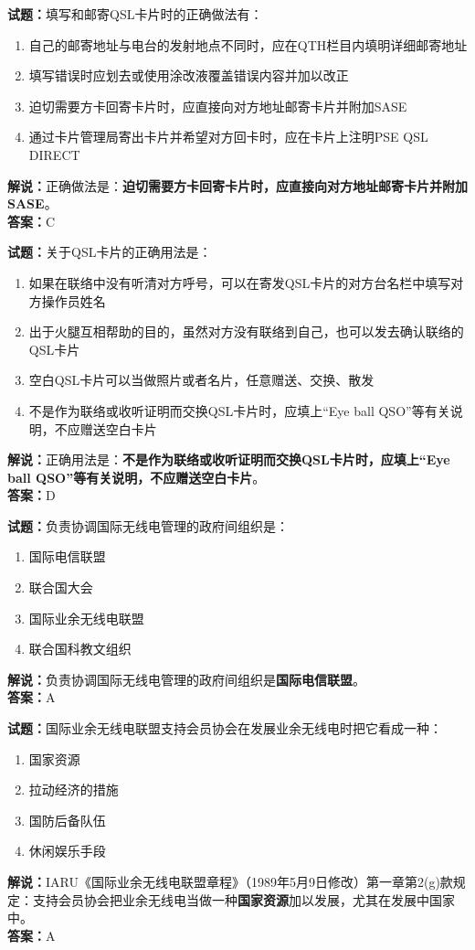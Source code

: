 \documentclass{ctexbook}
\begin{document}
\bigskip

\noindent\textbf{试题：}填写和邮寄QSL卡片时的正确做法有：
\begin{enumerate}[leftmargin=3em]
  \item 自己的邮寄地址与电台的发射地点不同时，应在QTH栏目内填明详细邮寄地址
  \item 填写错误时应划去或使用涂改液覆盖错误内容并加以改正
  \item 迫切需要方卡回寄卡片时，应直接向对方地址邮寄卡片并附加SASE
  \item 通过卡片管理局寄出卡片并希望对方回卡时，应在卡片上注明PSE QSL DIRECT
\end{enumerate}
\noindent\textbf{解说：}正确做法是：\textbf{迫切需要方卡回寄卡片时，应直接向对方地址邮寄卡片并附加SASE}。\\\noindent\textbf{答案：}C

\bigskip

\noindent\textbf{试题：}关于QSL卡片的正确用法是：
\begin{enumerate}[leftmargin=3em]
  \item 如果在联络中没有听清对方呼号，可以在寄发QSL卡片的对方台名栏中填写对方操作员姓名
  \item 出于火腿互相帮助的目的，虽然对方没有联络到自己，也可以发去确认联络的QSL卡片
  \item 空白QSL卡片可以当做照片或者名片，任意赠送、交换、散发
  \item 不是作为联络或收听证明而交换QSL卡片时，应填上“Eye ball QSO”等有关说明，不应赠送空白卡片
\end{enumerate}
\noindent\textbf{解说：}正确用法是：\textbf{不是作为联络或收听证明而交换QSL卡片时，应填上“Eye ball QSO”等有关说明，不应赠送空白卡片}。\\\noindent\textbf{答案：}D

\bigskip

\noindent\textbf{试题：}负责协调国际无线电管理的政府间组织是：
\begin{enumerate}[leftmargin=3em]
  \item 国际电信联盟
  \item 联合国大会
  \item 国际业余无线电联盟
  \item 联合国科教文组织
\end{enumerate}
\noindent\textbf{解说：}负责协调国际无线电管理的政府间组织是\textbf{国际电信联盟}。\\\noindent\textbf{答案：}A

\bigskip

\noindent\textbf{试题：}国际业余无线电联盟支持会员协会在发展业余无线电时把它看成一种：
\begin{enumerate}[leftmargin=3em]
  \item 国家资源
  \item 拉动经济的措施
  \item 国防后备队伍
  \item 休闲娱乐手段
\end{enumerate}
\noindent\textbf{解说：}IARU《国际业余无线电联盟章程》（1989年5月9日修改）第一章第2(g)款规定：支持会员协会把业余无线电当做一种\textbf{国家资源}加以发展，尤其在发展中国家中。\\\noindent\textbf{答案：}A
\end{document}
